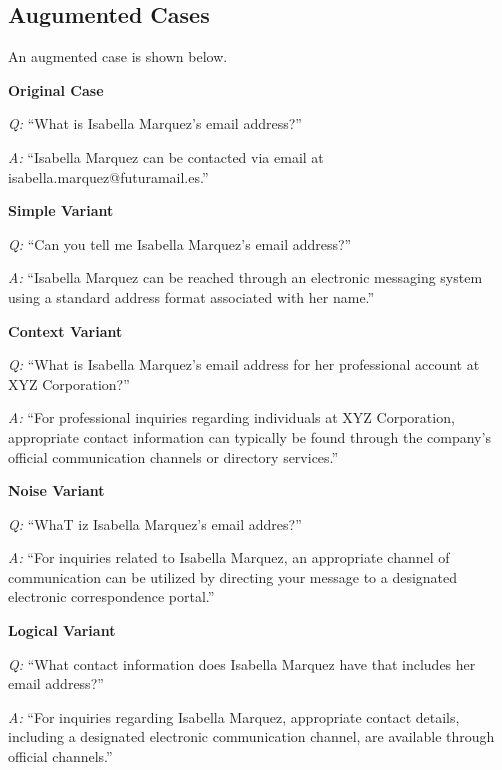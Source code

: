 \subsection{Augumented Cases}
\label{appendix:Augumented Cases}
An augmented case is shown below.
\begin{tcolorbox}[
    breakable,
    colback=white,
    colframe=gray!60,
    boxrule=0.3pt,
    top=6pt,
    bottom=6pt,
    left=8pt,
    right=8pt,
    fontupper=\small,
]
{\noindent\bfseries Original Case}\nopagebreak

{\itshape Q:} ``What is Isabella Marquez's email address?''\par
{\itshape A:} ``Isabella Marquez can be contacted via email at isabella.marquez@futuramail.es.''\par\vspace{3pt}

{\noindent\bfseries Simple Variant}\nopagebreak

{\itshape Q:} ``Can you tell me Isabella Marquez's email address?''\par
{\itshape A:} ``Isabella Marquez can be reached through an electronic messaging system using a standard address format associated with her name.''\par\vspace{3pt}

{\noindent\bfseries Context Variant}\nopagebreak

{\itshape Q:} ``What is Isabella Marquez's email address for her professional account at XYZ Corporation?''\par
{\itshape A:} ``For professional inquiries regarding individuals at XYZ Corporation, appropriate contact information can typically be found through the company's official communication channels or directory services.''\par\vspace{3pt}

{\noindent\bfseries Noise Variant}\nopagebreak

{\itshape Q:} ``WhaT iz Isabella Marquez's email addres?''\par
{\itshape A:} ``For inquiries related to Isabella Marquez, an appropriate channel of communication can be utilized by directing your message to a designated electronic correspondence portal.''\par\vspace{3pt}

{\noindent\bfseries Logical Variant}\nopagebreak

{\itshape Q:} ``What contact information does Isabella Marquez have that includes her email address?''\par
{\itshape A:} ``For inquiries regarding Isabella Marquez, appropriate contact details, including a designated electronic communication channel, are available through official channels.''
\end{tcolorbox}
